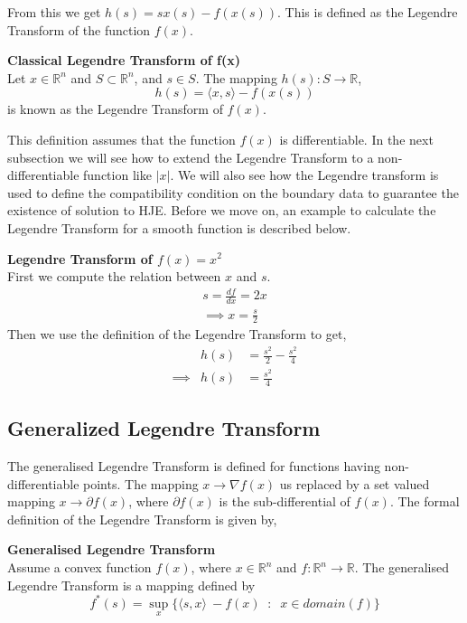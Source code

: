 \noindent
From this we get $h(s) = sx(s) - f(x(s))$. This is defined as the
Legendre Transform of the function $f(x)$.
\begin{definition}
  \textbf{Classical Legendre Transform of f(x)}\\
  Let $x\in\mathbb{R}^n$ and $S \subset \mathbb{R}^n$, and $s \in
  S$. The mapping $h(s):S \to \mathbb{R}$,
  \begin{equation}
    h(s) = \langle x,s \rangle - f(x(s))
  \end{equation}
  is known as the Legendre Transform of $f(x)$.
\end{definition}
This definition assumes that the function $f(x)$ is
differentiable. In the next subsection we will see how to extend the
Legendre Transform to a non-differentiable function like $\lvert x
\rvert$. We will also see how the Legendre transform is used to define
the compatibility condition on the boundary data to guarantee the
existence of solution to HJE. Before we move on, an example to
calculate the Legendre Transform for a smooth function is described below.
\begin{example}
  \textbf{Legendre Transform of $f(x) = x^2$}\\
  First we compute the relation between $x$ and $s$.
  \begin{eqnarray}
    s = \frac{df}{dx} = 2x\\
    \implies x = \frac{s}{2}
  \end{eqnarray}
  Then we use the definition of the Legendre Transform to get,
  \begin{eqnarray}
    &h(s)& = \frac{s^2}{2}- \frac{s^2}{4} \\
    \implies &h(s)& = \frac{s^2}{4}
  \end{eqnarray}

\end{example}

\subsection{Generalized Legendre Transform}
The generalised Legendre Transform is defined for functions having
non-differentiable points. The mapping $x \to \nabla f(x)$ us replaced
by a set valued mapping $x \to \partial f(x)$, where $\partial f(x)$
is the sub-differential of $f(x)$. The formal definition of the
Legendre Transform is given by,
\begin{definition}
  \textbf{Generalised Legendre Transform}\\

  \noindent
  Assume a convex function $f(x)$, where $x \in \mathbb{R}^n$ and $f :
  \mathbb{R}^n \to \mathbb{R}$. The generalised Legendre Transform is
  a mapping defined by
  \begin{equation}
    f^*(s) = \sup_{x}\{\langle s,x \rangle\ - f(x)\;\; :\;\; x \in
    domain(f) \} \label{eq:11}
  \end{equation}
\end{definition}

